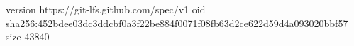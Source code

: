 version https://git-lfs.github.com/spec/v1
oid sha256:452bdee03dc3ddcbf0a3f22be884f0071f08fb63d2ce622d59d4a093020bbf57
size 43840
